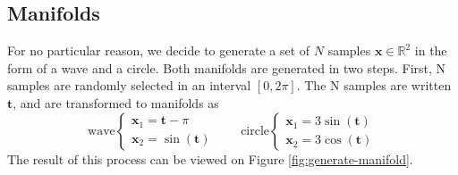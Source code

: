 \subsection*{Manifolds}
For no particular reason, we decide to generate a set of $N$ samples $\mathbf{x} \in \mathbb{R}^2$ in the form of a wave and a circle. Both manifolds are generated in two steps. First, N samples are randomly selected in an interval $[0, 2\pi]$. The N samples are written $\mathbf{t}$, and are transformed to manifolds as
$$
\text{wave}  \begin{cases}
      \mathbf{x}_1 = \mathbf{t} - \pi \\
      \mathbf{x}_2 = \sin(\mathbf{t})
    \end{cases}  \qquad \text{circle}  \begin{cases}
      \mathbf{x}_1 = 3\sin(\mathbf{t}) \\
      \mathbf{x}_2 = 3\cos(\mathbf{t})
    \end{cases}
$$
The result of this process can be viewed on Figure \ref{fig:generate-manifold}.
